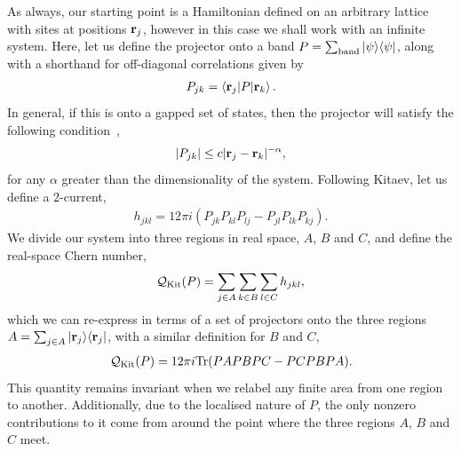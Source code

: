 As always, our starting point is a Hamiltonian defined on an arbitrary lattice with sites at positions $\textbf r_j$, however in this case we shall work with an infinite system. Here, let us define the projector onto a band $P = \sum_{\textup{band}} \ket{\psi}\!\bra{\psi}$, along with a shorthand for off-diagonal correlations given by 
\begin{align}
    P_{jk} = \braket{\textbf r_j |P| \textbf r_k}.
\end{align}
In general, if this is onto a gapped set of states, then the projector will satisfy the following condition~\cite{hastings_spectral_2006},
\begin{align}
    |P_{jk}| \leq c|\textbf r_j - \textbf r_k|^{-\alpha},
\end{align}
for any $\alpha$ greater than the dimensionality of the system. Following Kitaev, let us define a 2-current,
\begin{align}
    h_{jkl} = 12\pi i (P_{jk}P_{kl}P_{lj} - P_{jl}P_{lk}P_{kj}).
\end{align}
We divide our system into three regions in real space, $A$, $B$ and $C$, and define the real-space Chern number,
\begin{align}
    \mathcal Q_{\textup{Kit}}(P) = \sum_{j \in A}\sum_{k \in B}\sum_{l \in C} h_{jkl},
\end{align}
which we can re-express in terms of a set of projectors onto the three regions $A = \sum_{j \in A}\ket{\textbf r_j}\!\bra{\textbf r_j}$, with a similar definition for $B$ and $C$,
\begin{align} \label{eqn:qkit_def}
    \mathcal Q_{\textup{Kit}}(P) = 12\pi i \textup{Tr}( PAPBPC - PCPBPA) .
\end{align}
This quantity remains invariant when we relabel any finite area from one region to another. Additionally, due to the localised nature of $P$, the only nonzero contributions to it come from around the point where the three regions $A$, $B$ and $C$ meet. 

